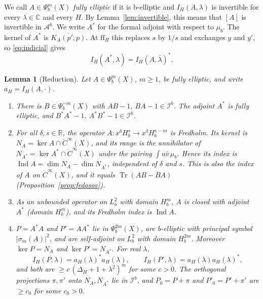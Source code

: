 \documentclass[11pt,oneside,reqno]{article}
\newcommand{\C}{\mathbb C}
\DeclareMathOperator{\Tr}{Tr}
\newcommand{\Ib}{\mathcal I^b}
\newcommand{\Ab}{\mathcal A^b}
\theoremstyle{plain}
\newtheorem{lemma}[theorem]{Lemma}
\theoremstyle{definition}
\theoremstyle{remark}
\begin{document}
We call \(A\in\Psi_b^m(X)\) \emph{fully elliptic} if it is b-elliptic and
\(I_H(A,\lambda)\) is invertible for every \(\lambda\in\C\) and every \(H\).
By Lemma~\ref{lem:invertible}, this means that \([A]\) is invertible in
\(\Ab\). We write \(A^*\) for the formal adjoint with respect to \(\mu_b\).
The kernel of \(A^*\) is \(\overline{K_A(p',p)}\). At \(\mathrm{ff}_H\) this
replaces \(s\) by \(1/s\) and exchanges \(y\) and \(y'\), so
\eqref{eq:indicial} gives
\begin{equation}\label{eq:Iadjoint}
 I_H(A^*,\lambda)=I_H(A,\bar\lambda)^* .
\end{equation}

\begin{lemma}[Reduction]\label{lem:reduction}
Let \(A\in\Psi_b^m(X)\), \(m\geq1\), be fully elliptic, and write
\(a_H=I_H(A,\cdot)\).
\begin{enumerate}
\item[(i)] There is \(B\in\Psi_b^{-m}(X)\) with \(AB-1,\ BA-1\in\Ib\). The
adjoint \(A^*\) is fully elliptic, and \(B^*A^*-1,\ A^*B^*-1\in\Ib\).
\item[(ii)] For all \(\delta,s\in\mathbb R\), the operator
\(A:x^\delta H^s_b\to x^\delta H^{s-m}_b\) is Fredholm. Its kernel is
\(N_A=\ker A\cap\dot C^\infty(X)\), and its range is the annihilator of
\(N_{A^*}=\ker A^*\cap\dot C^\infty(X)\) under the pairing
\(\int u\bar v\,\mu_b\). Hence its index is
\(\operatorname{Ind}A=\dim N_A-\dim N_{A^*}\), independent of \(\delta\) and
\(s\). This is also the index of \(A\) on \(\dot C^\infty(X)\), and it equals
\(\Tr(AB-BA)\) (Proposition~\ref{prop:fedosov}).
\item[(iii)] As an unbounded operator on \(L^2_b\) with domain \(H^m_b\),
\(A\) is closed with adjoint \(A^*\) (domain \(H^m_b\)), and its Fredholm
index is \(\operatorname{Ind}A\).
\item[(iv)] \(P=A^*A\) and \(P'=AA^*\) lie in \(\Psi_b^{2m}(X)\), are
b-elliptic with principal symbol \(|\sigma_m(A)|^2\), and are self-adjoint
on \(L^2_b\) with domain \(H^{2m}_b\). Moreover \(\ker P=N_A\) and
\(\ker P'=N_{A^*}\). For real \(\lambda\),
\[
 I_H(P,\lambda)=a_H(\lambda)^*a_H(\lambda),\qquad
 I_H(P',\lambda)=a_H(\lambda)a_H(\lambda)^*,
\]
and both are \(\geq c\,(\Delta_H+1+\lambda^2)^m\) for some \(c>0\). The
orthogonal projections \(\pi,\pi'\) onto \(N_A,N_{A^*}\) lie in \(\Ib\), and
\(P_0=P+\pi\) and \(P'_0=P'+\pi'\) are \(\geq c_0\) for some \(c_0>0\).
\end{enumerate}
\end{lemma}
\end{document}

